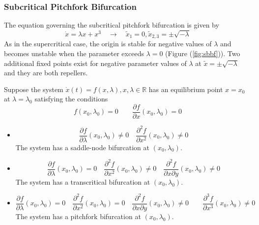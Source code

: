 \subsubsection{Subcritical Pitchfork Bifurcation}
The equation governing the subcritical pitchfork bifurcation is given by
\begin{equation}\label{eq:sbbf}
  \dot{x}=\lambda x+ x^3 \quad \rightarrow \quad \tilde{x}_1=0, \tilde{x}_{2,3}=\pm\sqrt{-\lambda}
\end{equation}
As in the supercritical case, the origin is stable for negative values of $\lambda$ and becomes unstable when the parameter exceeds $\lambda =0$ (Figure (\ref{fig:sbbf})).
Two additional fixed points exist for negative parameter values of $\lambda$ at $\tilde{x}=\pm\sqrt{-\lambda}$ and they are both repellers.
\begin{theorem}
  Suppose the system $\dot{x}(t)=f(x,\lambda), x,\lambda\in\mathbb{R}$ has an equilibrium point $x=x_0$ at $\lambda=\lambda_0$ satisfying the conditions
  \begin{equation}
    f(x_0,\lambda_0)=0\qquad\frac{\partial f}{\partial x}(x_0,\lambda_0)=0
  \end{equation}
  \begin{itemize}
    \item
    \begin{equation}
      \frac{\partial f}{\partial \lambda}(x_0,\lambda_0)\neq0\quad\frac{\partial^2 f}{\partial x^2}(x_0,\lambda_0)\neq0
    \end{equation}
    The system has a saddle-node bifurcation at $(x_0,\lambda_0)$.
    \item
    \begin{equation}
      \frac{\partial f}{\partial \lambda}(x_0,\lambda_0)=0\quad\frac{\partial^2 f}{\partial x^2}(x_0,\lambda_0)\neq0\quad\frac{\partial^2f}{\partial x\partial y}(x_0,\lambda_0)\neq0
    \end{equation}
    The system has a transcritical bifurcation at $(x_0,\lambda_0)$.
    \item
    \begin{equation}
      \frac{\partial f}{\partial \lambda}(x_0,\lambda_0)=0\quad\frac{\partial^2 f}{\partial x^2}(x_0,\lambda_0)=0\quad\frac{\partial^2f}{\partial x\partial y}(x_0,\lambda_0)\neq0\quad\quad\frac{\partial^3f}{\partial x^3}(x_0,\lambda_0)\neq0
    \end{equation}
    The system has a pitchfork bifurcation at $(x_0,\lambda_0)$.
  \end{itemize}
\end{theorem}
